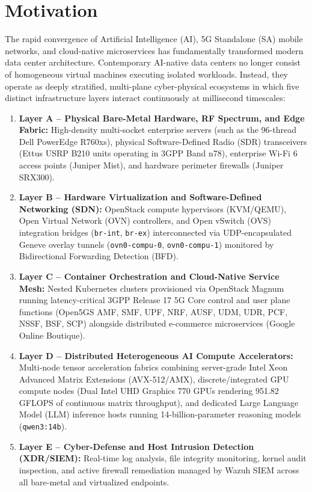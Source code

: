 \section{Motivation}
The rapid convergence of Artificial Intelligence (AI), 5G Standalone (SA) mobile networks, and cloud-native microservices has fundamentally transformed modern data center architecture. Contemporary AI-native data centers no longer consist of homogeneous virtual machines executing isolated workloads. Instead, they operate as deeply stratified, multi-plane cyber-physical ecosystems in which five distinct infrastructure layers interact continuously at millisecond timescales:
\begin{enumerate}
    \item \textbf{Layer A -- Physical Bare-Metal Hardware, RF Spectrum, and Edge Fabric:} High-density multi-socket enterprise servers (such as the 96-thread Dell PowerEdge R760xs), physical Software-Defined Radio (SDR) transceivers (Ettus USRP B210 units operating in 3GPP Band n78), enterprise Wi-Fi 6 access points (Juniper Mist), and hardware perimeter firewalls (Juniper SRX300).
    \item \textbf{Layer B -- Hardware Virtualization and Software-Defined Networking (SDN):} OpenStack compute hypervisors (KVM/QEMU), Open Virtual Network (OVN) controllers, and Open vSwitch (OVS) integration bridges (\texttt{br-int}, \texttt{br-ex}) interconnected via UDP-encapsulated Geneve overlay tunnels (\texttt{ovn0-compu-0}, \texttt{ovn0-compu-1}) monitored by Bidirectional Forwarding Detection (BFD).
    \item \textbf{Layer C -- Container Orchestration and Cloud-Native Service Mesh:} Nested Kubernetes clusters provisioned via OpenStack Magnum running latency-critical 3GPP Release 17 5G Core control and user plane functions (Open5GS AMF, SMF, UPF, NRF, AUSF, UDM, UDR, PCF, NSSF, BSF, SCP) alongside distributed e-commerce microservices (Google Online Boutique).
    \item \textbf{Layer D -- Distributed Heterogeneous AI Compute Accelerators:} Multi-node tensor acceleration fabrics combining server-grade Intel Xeon Advanced Matrix Extensions (AVX-512/AMX), discrete/integrated GPU compute nodes (Dual Intel UHD Graphics 770 GPUs rendering 951.82 GFLOPS of continuous matrix throughput), and dedicated Large Language Model (LLM) inference hosts running 14-billion-parameter reasoning models (\texttt{qwen3:14b}).
    \item \textbf{Layer E -- Cyber-Defense and Host Intrusion Detection (XDR/SIEM):} Real-time log analysis, file integrity monitoring, kernel audit inspection, and active firewall remediation managed by Wazuh SIEM across all bare-metal and virtualized endpoints.
\end{enumerate}

